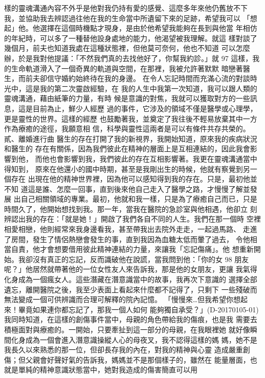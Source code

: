 樣的靈魂溝通內容不外乎是他對我仍持有愛的感覺、這麼多年來他仍舊放不下
我，並協助我去辨認過往他在我的生命當中所遺留下來的足跡，希望我可以
「想起」他。他選擇在這個時機點才現身，是由於他希望我能夠在長到與他當
年相仿的年紀時，可以多了一種替他設身處地的能力，他渴望被我理解。就這
樣對談了幾個月，前夫也知道我處在這種狀態裡，但他莫可奈何，他也不知道
可以怎麼辦，於是我對他提議：「不然我們真的去找他好了，你幫我約診。」就
97 
這樣，我的生命軌道滑入了一個奇異的軌道與空間，在那裡，我被允許著默默
暗戀著醫生，而前夫卻信守婚約始終待在我的身邊。 
在令人忘記時間而充滿心流的對談時光中，這是我的第二次靈啟經驗，在
我的人生中我第一次知道，我可以跟人類的靈魂溝通，藉由紙筆的力量，有時
候是意識的對焦，我就可以獲取對方的一些訊息，這是目前為止，鮮少人經歷
過的事件，它涉及的領域不僅是醫學或心理學，更是靈性的世界。這樣的經歷
也鼓勵著我，並奠定了我往後不輕易放棄其中一方作為療癒的途徑，我願意相
信，科學與靈性這兩者是可以有條件共存共榮的。 
貳、離婚進行曲 
醫生的存在打開了我的新視界，我開始知道，原來我的疾病狀況和醫生的
存在有關係，因為我們彼此在精神的層面上是互相連結的，因此我會影響到他，
而他也會影響到我，我們彼此的存在互相影響著。我更在靈魂溝通當中得知到，
原來在他還小的國中時期，甚至是我剛出生的時候，他就有察覺到另一個存在
出現在他的精神世界裡，因為他可以感知得到我的存在。只是，最初他並不知
道這是誰、怎麼一回事，直到後來他自己走入了醫學之路，才慢慢了解並發展
出自己相關領域的專業。最初，他就和我一樣，只是為了療癒自己而已，只是
時間久了，他開始想找到我。那一年，當我在醫院的急診室與他相遇，他卻立
刻辨認出我的存在：「就是她！」開啟了我們各自不同的人生。我們在那一個時
空裡相愛相戀，他則經常來我身邊看我，甚至帶我出去院外走走，一起過馬路、
走進了房間，發生了情侶熱戀會發生的事，直到我因為血糖太低而暈了過去，
令他相當自責，他才會想要借用彼此精神連結的力量，來讓我「忘記傷痛」。他
想重新開始。我卻沒有真正的忘記，反而識破他在說謊，當我問到他：「你的女
98 
朋友呢？」他居然就帶著他的一位女性友人來告訴我，那是他的女朋友，更讓
我氣得化身成為一個瘋女人。這些潛藏在潛意識當中的故事，我再次下意識的
選擇全部遺忘，離開醫院之後，我至少表面上看起來什麼都不記得了，只剩下
一些殘破而無法變成一個可供辨識而合理可解釋的院內記憶。 
「慢慢來…但我希望你想起來！畢竟如果連你都忘記了，那我一個人如何
能夠獨自承受？」(D-20170105-01) 
我同時知道，在這樣的創傷事件當中，母親的角色帶給我的傷痕，也是我
需要去積極面對與療癒的。一開始，只要牽扯到這一部分的母親，在我眼裡她
就好像瞬間化身成為一個會進入潛意識操縱人心的母夜叉，我不認得這樣的媽
媽，她不是我長久以來熟悉的那一位，但卻長存我的內在，對我的精神與心靈
造成嚴重創傷；但父親會好聲好氣的告訴我，媽媽並不是那個樣子的，雖然在
能量層面，也就是單純的精神意識狀態當中，她對我造成的傷害簡直可以用
